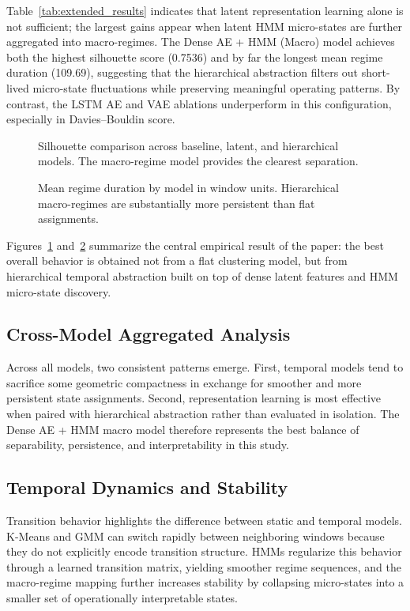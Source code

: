 \documentclass[conference]{IEEEtran}
\begin{document}
Table~\ref{tab:extended_results} indicates that latent representation learning alone is not sufficient; the largest gains appear when latent HMM micro-states are further aggregated into macro-regimes. The Dense AE + HMM (Macro) model achieves both the highest silhouette score (0.7536) and by far the longest mean regime duration (109.69), suggesting that the hierarchical abstraction filters out short-lived micro-state fluctuations while preserving meaningful operating patterns. By contrast, the LSTM AE and VAE ablations underperform in this configuration, especially in Davies--Bouldin score.

\begin{figure}[t]
\centering

\caption{Silhouette comparison across baseline, latent, and hierarchical models. The macro-regime model provides the clearest separation.}
\label{fig:silhouette_comparison}
\end{figure}

\begin{figure}[t]
\centering

\caption{Mean regime duration by model in window units. Hierarchical macro-regimes are substantially more persistent than flat assignments.}
\label{fig:duration_comparison}
\end{figure}

Figures~\ref{fig:silhouette_comparison} and~\ref{fig:duration_comparison} summarize the central empirical result of the paper: the best overall behavior is obtained not from a flat clustering model, but from hierarchical temporal abstraction built on top of dense latent features and HMM micro-state discovery.

\subsection{Cross-Model Aggregated Analysis}
Across all models, two consistent patterns emerge. First, temporal models tend to sacrifice some geometric compactness in exchange for smoother and more persistent state assignments. Second, representation learning is most effective when paired with hierarchical abstraction rather than evaluated in isolation. The Dense AE + HMM macro model therefore represents the best balance of separability, persistence, and interpretability in this study.

\subsection{Temporal Dynamics and Stability}
Transition behavior highlights the difference between static and temporal models. K-Means and GMM can switch rapidly between neighboring windows because they do not explicitly encode transition structure. HMMs regularize this behavior through a learned transition matrix, yielding smoother regime sequences, and the macro-regime mapping further increases stability by collapsing micro-states into a smaller set of operationally interpretable states.
\end{document}

